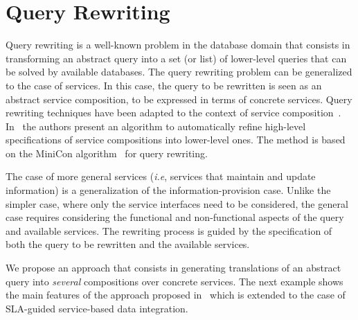  
\section{Query Rewriting}
\label{sec:queryRew}


Query rewriting is a well-known problem in the database domain that consists in transforming an abstract query into a set (or list) of lower-level queries that can be solved by  available databases.
The query rewriting problem can be generalized to the case of services.
In this case, the query to be rewritten is seen as an abstract service composition, to be expressed in terms of concrete services.
Query rewriting techniques have been adapted to the context of service composition~\cite{BBM10,ZLC11,CostaAMR13}. 
In~\cite{CostaAMR13} the authors present an algorithm to automatically refine high-level specifications of service compositions into lower-level ones. 
The method is based on the MiniCon algorithm~\cite{PH01} for query rewriting.

The case of more general services (\textit{i.e}, services that maintain and update information) is a generalization of the information-provision case.
Unlike the simpler case, where only the service interfaces need to be considered, the general case requires considering the functional and non-functional aspects of the query and available services.
The rewriting process is guided by the specification of both the query to be rewritten and the available services.


We propose an approach that consists in generating translations of an abstract query into \textit{several}  compositions over concrete  services. 
The next example shows the main features of the approach proposed in~\cite{CostaAMR13} which is extended to the case of SLA-guided service-based data integration. 

